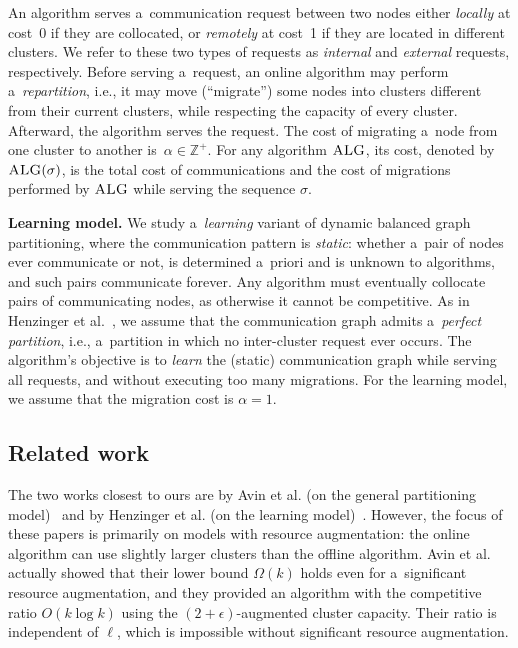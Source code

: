 \documentclass[a4paper,anonymous,USenglish]{lipics-v2019}
\newcommand{\ALG}{\textsc{ALG}\xspace}
\begin{document}
An algorithm serves a~communication request between two nodes
either \emph{locally} at cost~0
if they are collocated,
or \emph{remotely} at cost~1
if they are located in different clusters.
We refer to these two types of requests as \emph{internal}
and \emph{external} requests, respectively.
Before serving a~request,
an online algorithm may perform a~\emph{repartition},
i.e.,
it may move (``migrate'') some nodes into clusters different from their current clusters, while respecting the capacity of every cluster. 
Afterward, 
the algorithm serves the  request.
The cost of migrating a~node from one cluster to another
is~$\alpha \in \mathbb{Z}^+$.
For any algorithm $\ALG$,
its cost,
denoted by $\ALG(\sigma)$,
is the total cost of communications and
the cost of migrations performed by $\ALG$ while serving the sequence $\sigma$.



\noindent
\textbf{Learning model.}
We study a~\emph{learning} variant of dynamic balanced graph partitioning,
where the communication pattern is \emph{static}:
whether a~pair of  nodes ever communicate or not, 
is determined a~priori and is unknown to algorithms,
 and such pairs communicate forever.
Any algorithm must eventually collocate  pairs of communicating nodes,
as otherwise it cannot be competitive.
As in Henzinger et al.~\cite{sigmetrics19_partitioning}, we assume that the communication graph admits a~\emph{perfect partition},
i.e., a~partition in which no inter-cluster request ever occurs.
The algorithm's objective is to \emph{learn} the (static) communication graph
 while serving all requests,
and without executing too many migrations.
For the learning model, we  assume that the migration cost is $\alpha=1$.


\subsection{Related work}

The two works closest to ours are by Avin et al. (on the general partitioning model)~\cite{repartition-disc, sidma-arxiv} and by Henzinger et al. (on the learning model)~\cite{sigmetrics19_partitioning}.
However, the focus of these papers is primarily on models with resource augmentation: the online algorithm can use slightly larger clusters than the offline algorithm.  
Avin et al. actually showed that their lower bound $\Omega(k)$ holds even for a~significant resource augmentation, and they provided an algorithm with the competitive ratio $O(k \log k)$ using the $(2+\epsilon)$-augmented cluster capacity.
Their ratio is independent of $\ell$, which is impossible without significant resource augmentation.
\end{document}
